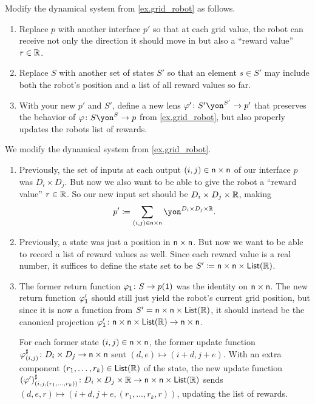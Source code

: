 \documentclass[Book-Poly]{subfiles}
\begin{document}
\begin{exercise} \label{exc.grid_reward}
Modify the dynamical system from \cref{ex.grid_robot} as follows.
\begin{enumerate}
	\item Replace $p$ with another interface $p'$ so that at each grid value, the robot can receive not only the direction it should move in but also a ``reward value'' $r\in\mathbb{R}$. 
	\item Replace $S$ with another set of states $S'$ so that an element $s\in S'$ may include both the robot's position and a list of all reward values so far.
	\item With your new $p'$ and $S'$, define a new lens $\varphi'\colon S'\yon^{S'}\to p'$ that preserves the behavior of $\varphi\colon S\yon^S\to p$ from \cref{ex.grid_robot}, but also properly updates the robots list of rewards.
\qedhere
\end{enumerate}
\begin{solution}
We modify the dynamical system from \cref{ex.grid_robot}.
\begin{enumerate}
    \item Previously, the set of inputs at each output $(i,j)\in\mathsf{n}\times\mathsf{n}$ of our interface $p$ was $D_i\times D_j$.
    But now we also want to be able to give the robot a ``reward value'' $r\in\mathbb{R}$.
    So our new input set should be $D_i\times D_j\times\mathbb{R}$, making
    \[
        p'\coloneqq\sum_{(i,j)\in\ord{n}\times\ord{n}} \yon^{D_i\times D_j\times\rr}.
    \]
    \item Previously, a state was just a position in $\mathsf{n}\times\mathsf{n}$.
    But now we want to be able to record a list of reward values as well.
    Since each reward value is a real number, it suffices to define the state set to be $S'\coloneqq\mathsf{n}\times\mathsf{n}\times\mathsf{List}(\mathbb{R})$.
    \item The former return function $\varphi_{\textsf{1}}\colon S\to p(\textsf{1})$ was the identity on $\mathsf{n}\times\mathsf{n}$.
    The new return function $\varphi'_{\textsf{1}}$ should still just yield the robot's current grid position, but since it is now a function from $S'=\mathsf{n}\times\mathsf{n}\times\mathsf{List}(\mathbb{R})$, it should instead be the canonical projection $\varphi'_{\textsf{1}}\colon \mathsf{n}\times\mathsf{n}\times\mathsf{List}(\mathbb{R})\to\mathsf{n}\times\mathsf{n}$.
    
    For each former state $(i,j)\in\mathsf{n}\times\mathsf{n}$, the former update function $\varphi^\sharp_{(i,j)}\colon D_i\times D_j\to\mathsf{n}\times\mathsf{n}$ sent $(d,e)\mapsto(i+d,j+e)$.
    With an extra component $(r_1,\ldots,r_k)\in\mathsf{List}(\mathbb{R})$ of the state, the new update function $(\varphi')^\sharp_{(i,j,(r_1,\ldots,r_k))}\colon D_i\times D_j\times\mathbb{R}\to\mathsf{n}\times\mathsf{n}\times\mathsf{List}(\mathbb{R})$ sends $(d,e,r)\mapsto(i+d,j+e,(r_1,\ldots,r_k,r))$, updating the list of rewards.
\end{enumerate}
\end{solution}
\end{exercise}
\end{document}
